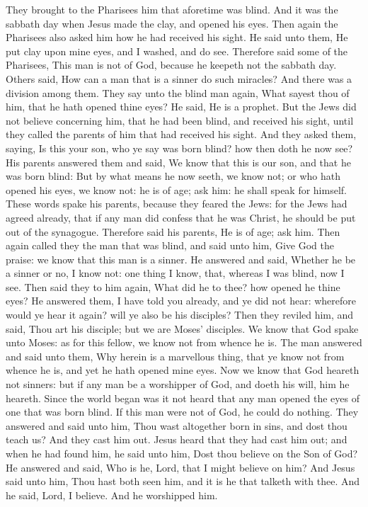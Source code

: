  They brought to the Pharisees him that aforetime was
blind.  And it was the sabbath day when Jesus made the
clay, and opened his eyes.  Then again the Pharisees also
asked him how he had received his sight. He said unto them, He put clay
upon mine eyes, and I washed, and do see.  Therefore said
some of the Pharisees, This man is not of God, because he keepeth not
the sabbath day. Others said, How can a man that is a sinner do such
miracles? And there was a division among them.  They say
unto the blind man again, What sayest thou of him, that he hath opened
thine eyes? He said, He is a prophet.  But the Jews did not
believe concerning him, that he had been blind, and received his sight,
until they called the parents of him that had received his sight.
 And they asked them, saying, Is this your son, who ye say
was born blind? how then doth he now see?  His parents
answered them and said, We know that this is our son, and that he was
born blind:  But by what means he now seeth, we know not;
or who hath opened his eyes, we know not: he is of age; ask him: he
shall speak for himself.  These words spake his parents,
because they feared the Jews: for the Jews had agreed already, that if
any man did confess that he was Christ, he should be put out of the
synagogue.  Therefore said his parents, He is of age; ask
him.  Then again called they the man that was blind, and
said unto him, Give God the praise: we know that this man is a sinner.
 He answered and said, Whether he be a sinner or no, I know
not: one thing I know, that, whereas I was blind, now I see.
 Then said they to him again, What did he to thee? how
opened he thine eyes?  He answered them, I have told you
already, and ye did not hear: wherefore would ye hear it again? will ye
also be his disciples?  Then they reviled him, and said,
Thou art his disciple; but we are Moses' disciples.  We
know that God spake unto Moses: as for this fellow, we know not from
whence he is.  The man answered and said unto them, Why
herein is a marvellous thing, that ye know not from whence he is, and
yet he hath opened mine eyes.  Now we know that God heareth
not sinners: but if any man be a worshipper of God, and doeth his will,
him he heareth.  Since the world began was it not heard
that any man opened the eyes of one that was born blind. 
If this man were not of God, he could do nothing.  They
answered and said unto him, Thou wast altogether born in sins, and dost
thou teach us? And they cast him out.  Jesus heard that
they had cast him out; and when he had found him, he said unto him, Dost
thou believe on the Son of God?  He answered and said, Who
is he, Lord, that I might believe on him?  And Jesus said
unto him, Thou hast both seen him, and it is he that talketh with thee.
 And he said, Lord, I believe. And he worshipped him.

